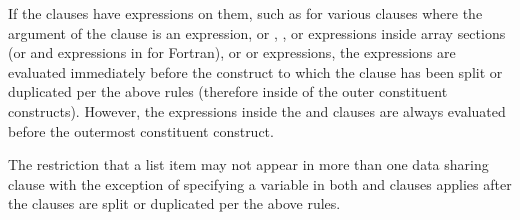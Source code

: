 If the clauses have expressions on them, such as for various clauses where the 
argument of the clause is an expression, or , , or 
 expressions inside array sections (or  and  
expressions in  for Fortran), or  or
 expressions, the expressions are evaluated immediately before 
the construct to which the clause has been split or duplicated per the above 
rules (therefore inside of the outer constituent constructs). However, the 
expressions inside the  and  clauses are 
always evaluated before the outermost constituent construct.

The restriction that a list item may not appear in more than one data
sharing clause with the exception of specifying a variable in both
 and  clauses applies after the clauses
are split or duplicated per the above rules.

